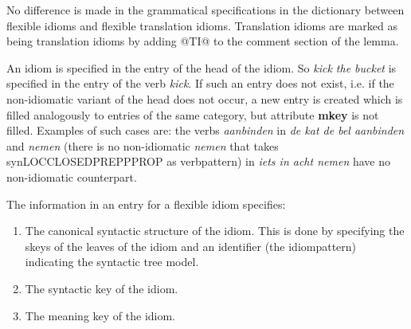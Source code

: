 No difference is made in the grammatical specifications in the dictionary
between flexible idioms and flexible translation idioms. Translation idioms are
marked as being translation idioms by adding @TI@ to the comment section of the 
lemma. 

An idiom is specified in the entry of the head of the idiom. So {\em kick the
bucket} is specified in the entry of the verb {\em kick}. If such an entry does
not exist, i.e. if the non-idiomatic variant of the head does not occur, a new
entry is created which is filled analogously to entries of the same category,
but attribute {\bf mkey} is not filled. Examples of such cases are: the
verbs {\em aanbinden} in {\em de kat de bel aanbinden} and {\em nemen} (there
is no non-idiomatic {\em nemen} that takes synLOCCLOSEDPREPPPROP as
verbpattern) in {\em iets in acht nemen} have no non-idiomatic counterpart. 

The information in an entry for a flexible idiom specifies:
\begin{enumerate}
  \item The canonical syntactic structure of the idiom. This is done by 
specifying the skeys of the leaves of the idiom and an identifier (the 
idiompattern) indicating
the syntactic tree model. 
  \item The syntactic key of the idiom.
  \item The meaning key of the idiom.
\end{enumerate}

